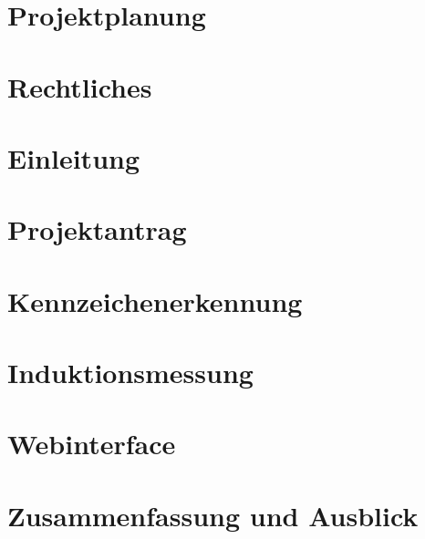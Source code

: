 \documentclass[12pt]{article}
\begin{document}
\section{Projektplanung}
\pagebreak


\section{Rechtliches}
\pagebreak


\section{Einleitung}

\pagebreak


\section{Projektantrag}

\pagebreak


\section{Kennzeichenerkennung}

\pagebreak


\section{Induktionsmessung}

\pagebreak


\section{Webinterface}

\pagebreak


\section{Zusammenfassung und Ausblick}

\pagebreak


%


%
\end{document}
